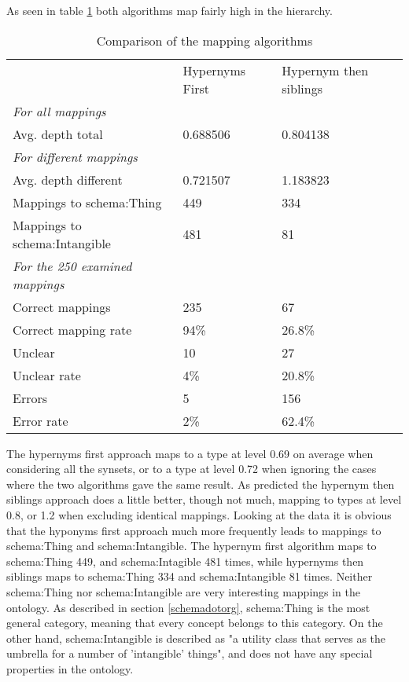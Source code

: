 As seen in table \ref{table:AlgorithmComparison} both algorithms map fairly high in the hierarchy.
\begin{table}[ht]
	\centering
	\begin{tabular}{lll}
											& Hypernyms First 	& Hypernym then siblings	\\
		\emph{For all mappings}				&					&							\\
		Avg. depth total					& 0.688506 			& 0.804138					\\[0.15cm]
		\emph{For different mappings}		&					&							\\
		Avg. depth different				& 0.721507			& 1.183823					\\
		Mappings to schema:Thing			& 449				& 334						\\
		Mappings to schema:Intangible		& 481				& 81						\\[0.15cm]
		\emph{For the 250 examined mappings}&					&							\\
		Correct mappings					& 235				& 67						\\
		Correct mapping	rate				& 94\%				& 26.8\%					\\
		Unclear								& 10				& 27						\\
		Unclear	rate						& 4\%				& 20.8\%					\\
		Errors								& 5 				& 156 						\\
		Error rate							& 2\%				& 62.4\%					\\
	\end{tabular}
	\caption{Comparison of the mapping algorithms}
	\label{table:AlgorithmComparison}
\end{table}
The hypernyms first approach maps to a type at level 0.69 on average when considering all the synsets,
or to a type at level 0.72 when ignoring the cases where the two algorithms gave the same result.
As predicted the hypernym then siblings approach does a little better, though not much,
mapping to types at level 0.8, or 1.2 when excluding identical mappings.
Looking at the data it is obvious that the hyponyms first approach much more frequently leads to mappings to schema:Thing and schema:Intangible.
The hypernym first algorithm maps to schema:Thing 449, and schema:Intagible 481 times,
while hypernyms then siblings maps to schema:Thing 334 and schema:Intangible 81 times.
Neither schema:Thing nor schema:Intangible are very interesting mappings in the ontology.
As described in section \ref{schemadotorg}, schema:Thing is the most general category, meaning that every concept belongs to this category.
On the other hand, schema:Intangible is described as "a utility class that serves as the umbrella for a number of 'intangible' things",
and does not have any special properties in the ontology.

